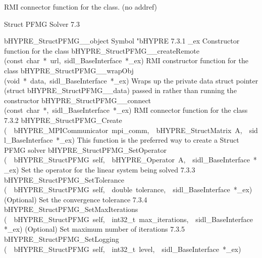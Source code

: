 \documentclass{article}
\begin{document}
\begin{cxxentry}
\begin{cxxentry}
\begin{cxxvariable}
\begin{cxxdoc}
RMI connector function for the class. (no addref)
\end{cxxdoc}
\end{cxxvariable}
\end{cxxentry}
\begin{cxxentry}
{}
        {Struct PFMG Solver}
        {}
        {
}
        {7.3}
\begin{cxxnames}
        {bHYPRE\_StructPFMG\_\_object}
        {}
        {
Symbol "bHYPRE}
        {7.3.1}
        {\_ex}
        {}
        {
Constructor function for the class}
        {}
\label{cxx.7.3.11}
        {bHYPRE\_StructPFMG\_\_createRemote}
        {(const\ char\ *\ url,\ sidl\_BaseInterface\ *\_ex)}
        {
RMI constructor function for the class}
        {}
\label{cxx.7.3.12}
        {bHYPRE\_StructPFMG\_\_wrapObj}
        {(void\ *\ data,\ sidl\_BaseInterface\ *\_ex)}
        {
Wraps up the private data struct pointer (struct bHYPRE\_StructPFMG\_\_data) passed in rather than running the constructor}
        {}
\label{cxx.7.3.13}
        {bHYPRE\_StructPFMG\_\_connect}
        {(const\ char\ *,\ sidl\_BaseInterface\ *\_ex)}
        {
RMI connector function for the class}
        {7.3.2}
        {bHYPRE\_StructPFMG\_Create}
        {(\ \ bHYPRE\_MPICommunicator\ mpi\_comm,\ \ bHYPRE\_StructMatrix\ A,\ \ sidl\_BaseInterface\ *\_ex)}
        {
This function is the preferred way to create a Struct PFMG solver}
        {}
\label{cxx.7.3.14}
        {bHYPRE\_StructPFMG\_SetOperator}
        {(\ \ bHYPRE\_StructPFMG\ self,\ \ bHYPRE\_Operator\ A,\ \ sidl\_BaseInterface\ *\_ex)}
        {
Set the operator for the linear system being solved}
        {7.3.3}
        {bHYPRE\_StructPFMG\_SetTolerance}
        {(\ \ bHYPRE\_StructPFMG\ self,\ \ double\ tolerance,\ \ sidl\_BaseInterface\ *\_ex)}
        {
(Optional) Set the convergence tolerance}
        {7.3.4}
        {bHYPRE\_StructPFMG\_SetMaxIterations}
        {(\ \ bHYPRE\_StructPFMG\ self,\ \ int32\_t\ max\_iterations,\ \ sidl\_BaseInterface\ *\_ex)}
        {
(Optional) Set maximum number of iterations}
        {7.3.5}
        {bHYPRE\_StructPFMG\_SetLogging}
        {(\ \ bHYPRE\_StructPFMG\ self,\ \ int32\_t\ level,\ \ sidl\_BaseInterface\ *\_ex)}

\end{cxxnames}
\end{cxxentry}
\end{cxxentry}
\end{document}
